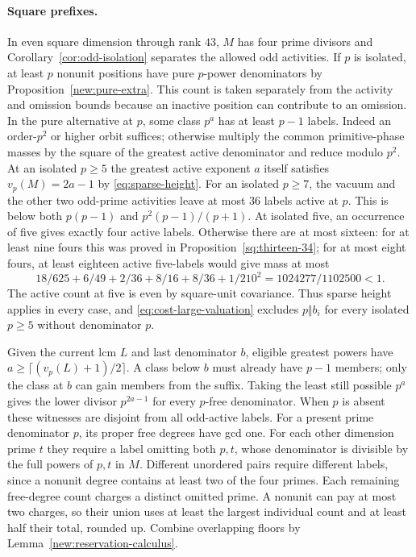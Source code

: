 \documentclass[11pt]{amsart}
\numberwithin{equation}{section}
\theoremstyle{definition}
\theoremstyle{plain}
\begin{document}
\paragraph{Square prefixes.}
In even square dimension through rank $43$, $M$ has four prime divisors and
Corollary~\ref{cor:odd-isolation} separates the allowed odd
activities. If $p$ is isolated, at least $p$
nonunit positions have pure $p$-power denominators by
Proposition~\ref{new:pure-extra}. This count is taken separately
from the activity and omission bounds because an inactive position
can contribute to an omission. In the pure alternative at $p$, some class $p^a$ has
at least $p-1$ labels. Indeed an order-$p^2$ or higher orbit suffices;
otherwise multiply the common primitive-phase masses by the square
of the greatest active denominator and reduce modulo $p^2$.
At an isolated $p\ge5$ the greatest active exponent $a$ itself
satisfies $v_p(M)=2a-1$ by \eqref{eq:sparse-height}.
For an isolated $p\ge7$, the vacuum and the other two odd-prime activities
leave at most $36$ labels active at $p$. This is below both
$p(p-1)$ and $p^2(p-1)/(p+1)$. At isolated five, an occurrence of
five gives exactly four active labels. Otherwise there are at most
sixteen: for at least nine fours this was proved in
Proposition~\ref{sq:thirteen-34}; for at most eight fours, at least eighteen
active five-labels would give mass at most
\[
 18/625+6/49+2/36+8/16+8/36+1/210^2
 =1024277/1102500<1.
\]
The active count at five is even by square-unit covariance.
Thus sparse height applies in every case, and
\eqref{eq:cost-large-valuation} excludes $p\Vert b_i$ for every
isolated $p\ge5$ without denominator $p$.

Given the current lcm $L$ and last denominator $b$, eligible
greatest powers have $a\ge\lceil(v_p(L)+1)/2\rceil$. A class below
$b$ must already have $p-1$ members; only the class at $b$ can
gain members from the suffix. Taking the least still possible
$p^a$ gives the lower divisor $p^{2a-1}$ for every $p$-free
denominator. When $p$ is absent these witnesses are disjoint
from all odd-active labels. For a present prime denominator
$p$, its proper free degrees have gcd one. For each other
dimension prime $t$ they require a label omitting both $p,t$,
whose denominator is divisible by the full powers of $p,t$ in $M$.
Different unordered pairs require different labels, since a
nonunit degree contains at least two of the four primes.
Each remaining free-degree count charges a distinct omitted prime.
A nonunit can pay at most two charges, so their union uses at least
the largest individual count and at least half their total, rounded up.
Combine overlapping floors by Lemma~\ref{new:reservation-calculus}.
\end{document}
